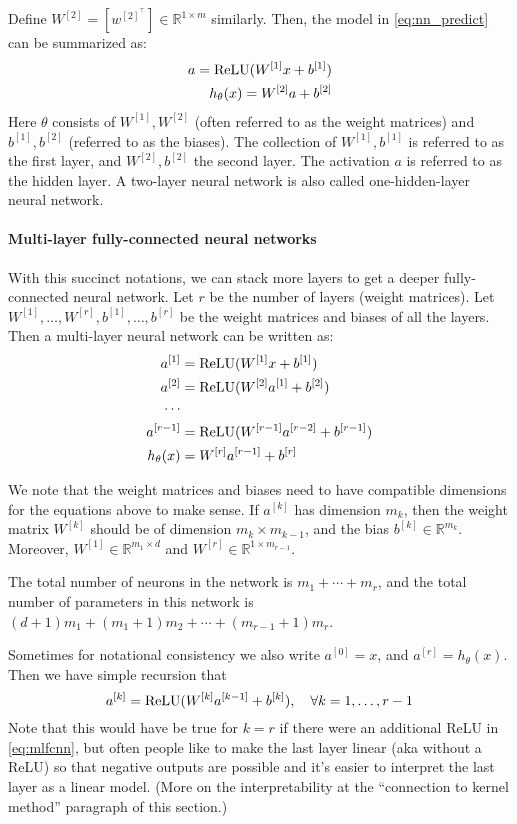 Define $W^{[2]} = [w^{[2]^\top} ] \in \mathbb{R}^{1 \times m}$ similarly. Then, the model in \cref{eq:nn_predict}
can be summarized as:
\begin{align}
    a = \operatorname{ReLU}(W^{[1]} x + b^{[1]})\\
    h_\theta(x) = W^{[2]} a + b^{[2]}\label{eq:nn_model}
\end{align}
Here $\theta$ consists of $W^{[1]} ,W^{[2]}$ (often referred to as the weight matrices) and
$b^{[1]} ,b^{[2]}$ (referred to as the biases). The collection of $W^{[1]} ,b^{[1]}$ is referred to as
the first layer, and $W^{[2]} ,b^{[2]}$ the second layer. The activation $a$ is referred to as
the hidden layer. A two-layer neural network is also called one-hidden-layer
neural network.


\paragraph{Multi-layer fully-connected neural networks} With this succinct notations,
we can stack more layers to get a deeper fully-connected neural
network. Let $r$ be the number of layers (weight matrices). Let
$W^{[1]} ,\ldots,W^{[r]} ,b^{[1]} ,\ldots,b^{[r]}$ be the weight matrices and biases of all the layers.
Then a multi-layer neural network can be written as:
\begin{align}
    a^{[1]} &= \operatorname{ReLU}(W^{[1]} x + b^{[1]})\\
    a^{[2]} &= \operatorname{ReLU}(W^{[2]} a^{[1]} + b^{[2]} )\\
    \cdots\\
    a^{[r-1]} &= \operatorname{ReLU}(W^{[r-1]} a^{[r-2]} + b^{[r-1]})\\
    h_\theta(x) &= W^{[r]} a^{[r-1]} + b^{[r]}\label{eq:mlfcnn}
\end{align}

We note that the weight matrices and biases need to have compatible
dimensions for the equations above to make sense. If $a^{[k]}$ has dimension $m_k$,
then the weight matrix $W^{[k]}$ should be of dimension $m_k \times m_{k-1}$, and the bias
$b^{[k]} \in \mathbb{R}^{m_k}$. Moreover, $W^{[1]} \in \mathbb{R}^{m_1 \times d}$ and $W^{[r]} \in \mathbb{R}^{1 \times m_{r-1}}$.

The total number of neurons in the network is $m_1 + \cdots + m_r$, and the
total number of parameters in this network is $(d+1)m_1 +(m_1 + 1)m_2 + \cdots + (m_{r-1} + 1)m_r$.

Sometimes for notational consistency we also write $a^{[0]} = x$, and $a^{[r]} = h_\theta(x)$. Then we have simple recursion that
\begin{equation}
    a^{[k]} = \operatorname{ReLU}(W^{[k]} a^{[k-1]} + b^{[k]}),\quad \forall k = 1,\ldots,r-1
\end{equation}
Note that this would have be true for $k = r$ if there were an additional
ReLU in \cref{eq:mlfcnn}, but often people like to make the last layer linear
(aka without a ReLU) so that negative outputs are possible and it's easier
to interpret the last layer as a linear model. (More on the interpretability at
the ``connection to kernel method'' paragraph of this section.)

